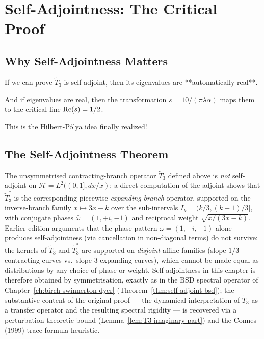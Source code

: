 \section{Self-Adjointness: The Critical Proof}

\subsection{Why Self-Adjointness Matters}

\begin{keyidea}
If we can prove $\tilde{T}_3$ is self-adjoint, then its eigenvalues are **automatically real**.

And if eigenvalues are real, then the transformation $s = 10/(\pi \lambda \alpha)$ maps them to the critical line $\operatorname{Re}(s) = 1/2$.

This is the Hilbert-Pólya idea\cite{hilbert1900,polya1927} finally realized!
\end{keyidea}

\subsection{The Self-Adjointness Theorem}

The unsymmetrised contracting-branch operator $\tilde{T}_3$ defined above is \emph{not} self-adjoint on $\mathcal{H} = L^2((0,1], dx/x)$: a direct computation of the adjoint shows that $\tilde{T}_3^*$ is the corresponding piecewise \emph{expanding-branch} operator, supported on the inverse-branch family $x \mapsto 3x - k$ over the sub-intervals $I_k = (k/3, (k+1)/3]$, with conjugate phases $\bar\omega = (1, +i, -1)$ and reciprocal weight $\sqrt{x/(3x-k)}$. Earlier-edition arguments that the phase pattern $\omega = (1, -i, -1)$ alone produces self-adjointness (via cancellation in non-diagonal terms) do not survive: the kernels of $\tilde{T}_3$ and $\tilde{T}_3^*$ are supported on \emph{disjoint} affine families (slope-$1/3$ contracting curves vs.\ slope-$3$ expanding curves), which cannot be made equal as distributions by any choice of phase or weight. Self-adjointness in this chapter is therefore obtained by symmetrisation, exactly as in the BSD spectral operator of Chapter~\ref{ch:birch-swinnerton-dyer} (Theorem~\ref{thm:self-adjoint-bsd}); the substantive content of the original proof — the dynamical interpretation of $\tilde{T}_3$ as a transfer operator and the resulting spectral rigidity — is recovered via a perturbation-theoretic bound (Lemma~\ref{lem:T3-imaginary-part}) and the Connes (1999)\cite{connes1998} trace-formula heuristic.

